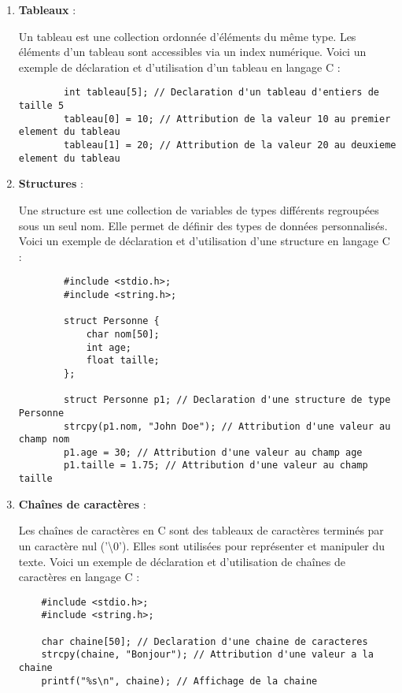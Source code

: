 \begin{enumerate}[label=\alph*)]
	\item \textbf{Tableaux} :
	
	Un tableau est une collection ordonnée d'éléments du même type. Les éléments d'un tableau sont accessibles via un index numérique. Voici un exemple de déclaration et d'utilisation d'un tableau en langage C :
	
	\begin{lstlisting}
		int tableau[5]; // Declaration d'un tableau d'entiers de taille 5
		tableau[0] = 10; // Attribution de la valeur 10 au premier element du tableau
		tableau[1] = 20; // Attribution de la valeur 20 au deuxieme element du tableau
	\end{lstlisting}
	
	\item \textbf{Structures} :
	
	Une structure est une collection de variables de types différents regroupées sous un seul nom. Elle permet de définir des types de données personnalisés. Voici un exemple de déclaration et d'utilisation d'une structure en langage C :
	
	\begin{lstlisting}
		#include <stdio.h>;
		#include <string.h>;
		
		struct Personne {
			char nom[50];
			int age;
			float taille;
		};
		
		struct Personne p1; // Declaration d'une structure de type Personne
		strcpy(p1.nom, "John Doe"); // Attribution d'une valeur au champ nom
		p1.age = 30; // Attribution d'une valeur au champ age
		p1.taille = 1.75; // Attribution d'une valeur au champ taille
	\end{lstlisting}

 \item \textbf{Chaînes de caractères} :

Les chaînes de caractères en C sont des tableaux de caractères terminés par un caractère nul ('\textbackslash0'). Elles sont utilisées pour représenter et manipuler du texte. Voici un exemple de déclaration et d'utilisation de chaînes de caractères en langage C :

\begin{lstlisting}
	#include <stdio.h>;
	#include <string.h>;
	
	char chaine[50]; // Declaration d'une chaine de caracteres
	strcpy(chaine, "Bonjour"); // Attribution d'une valeur a la chaine
	printf("%s\n", chaine); // Affichage de la chaine
\end{lstlisting}

\end{enumerate}

